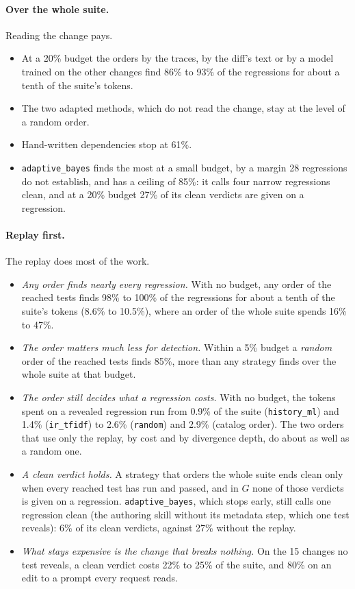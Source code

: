 \documentclass[11pt,a4paper]{article}
\newcommand{\strat}[1]{\texttt{#1}}
\begin{document}
\paragraph{Over the whole suite.} Reading the change pays.
\begin{itemize}
  \item At a 20\% budget the orders by the traces, by the diff's text or by a model trained on the other changes
        find 86\% to 93\% of the regressions for about a tenth of the suite's tokens.
  \item The two adapted methods, which do not read the change, stay at the level of a random order.
  \item Hand-written dependencies stop at 61\%.
  \item \strat{adaptive\_bayes} finds the most at a small budget, by a margin 28 regressions do not establish, and
        has a ceiling of 85\%: it calls four narrow regressions clean, and at a 20\% budget 27\% of its clean
        verdicts are given on a regression.
\end{itemize}

\paragraph{Replay first.} The replay does most of the work.
\begin{itemize}
  \item \emph{Any order finds nearly every regression.} With no budget, any order of the reached tests finds 98\%
        to 100\% of the regressions for about a tenth of the suite's tokens (8.6\% to 10.5\%), where an order of
        the whole suite spends 16\% to 47\%.
  \item \emph{The order matters much less for detection.} Within a 5\% budget a \emph{random} order of the reached
        tests finds 85\%, more than any strategy finds over the whole suite at that budget.
  \item \emph{The order still decides what a regression costs.} With no budget, the tokens spent on a revealed
        regression run from 0.9\% of the suite (\strat{history\_ml}) and 1.4\% (\strat{ir\_tfidf}) to 2.6\%
        (\strat{random}) and 2.9\% (catalog order). The two orders that use only the replay, by cost and by
        divergence depth, do about as well as a random one.
  \item \emph{A clean verdict holds.} A strategy that orders the whole suite ends clean only when every reached
        test has run and passed, and in $G$ none of those verdicts is given on a regression.
        \strat{adaptive\_bayes}, which stops early, still calls one regression clean (the authoring skill without
        its metadata step, which one test reveals): 6\% of its clean verdicts, against 27\% without the replay.
  \item \emph{What stays expensive is the change that breaks nothing.} On the 15 changes no test reveals, a clean
        verdict costs 22\% to 25\% of the suite, and 80\% on an edit to a prompt every request reads.
\end{itemize}
\end{document}
